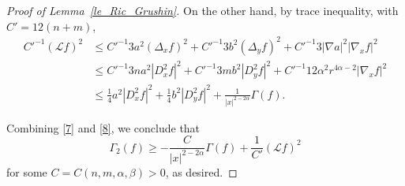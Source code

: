 \documentclass[10pt,a4paper]{amsart}
\begin{document}
\begin{proof}[Proof of Lemma~\ref{le_Ric_Grushin}]
On the other hand, by trace inequality, with $C'=12(n+m)$, 
\begin{align}\label{8}
C'^{-1}(\mathcal L f)^2 &\le
C'^{-1} 3a^2(\Delta_x f)^2+ C'^{-1} 3b^2(\Delta_y f)^2+ C'^{-1}3|\nabla a|^2|\nabla_x f|^2\\ \nonumber
&\le C'^{-1} 3n a^2|D_x^2 f|^2 + C'^{-1} 3m b^2|D_y^2 f|^2 + C'^{-1} 12\alpha^2 r^{4\alpha-2}|\nabla_x f|^2\\ \nonumber
&\le \frac14 a^2|D_x^2 f|^2+\frac14 b^2|D_y^2 f|^2+\frac1{|x|^{2-2\alpha}}\Gamma(f).
\end{align}

Combining \eqref{7} and \eqref{8}, we conclude that
\begin{equation*}
    \Gamma_2(f)\ge -\frac{C}{|x|^{2-2\alpha}}\Gamma(f)+\frac1{C'}(\mathcal L f)^2
\end{equation*}
for some $C=C(n,m,\alpha,\beta)>0$, as desired.





\end{proof}
\end{document}

